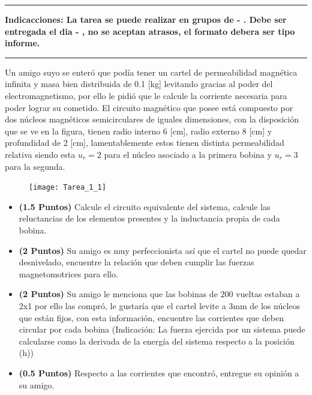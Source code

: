 \documentclass[
  11pt,
  letterpaper,
   addpoints,
   answers
  ]{exam}
\begin{document}
\vspace{0.5cm}
\noindent
\vspace{.85cm}
\hrule
\textbf{Indicacciones: La tarea se puede realizar en grupos de - . Debe ser entregada el dia - , no se aceptan atrasos, el formato debera ser tipo informe.}
\hrule
\noindent
\vspace{.85cm}
\begin{questions}
    \question Un amigo suyo se enteró que podía tener un cartel de permeabilidad magnética infinita y masa bien distribuida de 0.1 [kg] levitando gracias al poder del electromagnetismo, por ello le pidió que le calcule la corriente necesaria para poder lograr su cometido. El circuito magnético que posee está compuesto por dos núcleos magnéticos semicirculares de iguales dimensiones, con la disposición que se ve en la figura, tienen radio interno 6 [cm], radio externo 8 [cm] y profundidad de 2 [cm], lamentablemente estos tienen distinta permeabilidad relativa siendo esta $u_{r}=2$ para el núcleo asociado a la primera bobina y $u_{r}=3$ para la segunda.
    \begin{figure}[h!]
        \centering
        \texttt{[image: Tarea\_1\_1]}
    \end{figure}
    \begin{itemize}
        \item \textbf{(1.5 Puntos)} Calcule el circuito equivalente del sistema, calcule las reluctancias de los elementos presentes y la inductancia propia de cada bobina.
        \item \textbf{(2 Puntos)} Su amigo es muy perfeccionista así que el cartel no puede quedar desnivelado, encuentre la relación que deben cumplir las fuerzas magnetomotrices para ello.
        \item \textbf{(2 Puntos)} Su amigo le menciona que las bobinas de 200 vueltas estaban a 2x1 por ello las compró, le gustaría que el cartel levite a 3mm de los núcleos que están fijos, con esta información, encuentre las corrientes que deben circular por cada bobina (Indicación: La fuerza ejercida por un sistema puede calcularse como la derivada de la energía del sistema respecto a la posición (h))
        \item \textbf{(0.5 Puntos)} Respecto a las corrientes que encontró, entregue su opinión a su amigo.
    \end{itemize}


\end{questions}
\end{document}
